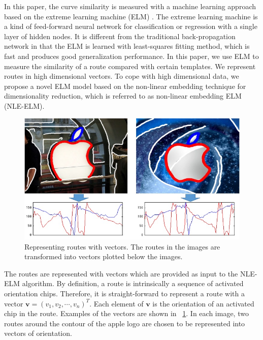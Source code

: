 \documentclass[journal]{IEEEtran}
\begin{document}
In this paper, the curve similarity is measured with a machine learning approach based on 
the extreme learning machine (ELM) \cite{huang2006}.
The extreme learning machine is a kind of feed-forward neural network for classification or regression
with a single layer of hidden nodes.
It is different from the traditional back-propagation network in that 
the ELM is learned with least-squares fitting method, which is fast and produces good generalization performance.
In this paper, we use ELM to measure the similarity of a route compared with certain templates.
We represent routes in high dimensional vectors.
To cope with high dimensional data, we propose a novel ELM model based on the non-linear embedding technique
for dimensionality reduction, which is referred to as non-linear embedding ELM (NLE-ELM).

\begin{figure}[!t]
\centering
\includegraphics[width=0.9\linewidth]{images/fig12.jpg}
\caption{Representing routes with vectors.
The routes in the images are transformed into vectors plotted below the images.}
\label{fig:12}
\end{figure}

The routes are represented with vectors which are provided as input to the NLE-ELM algorithm.
By definition, a route is intrinsically a sequence of activated orientation chips.
Therefore, it is straight-forward to represent a route with a vector $\boldsymbol{v}=(v_1,v_2,\cdots,v_n)^T$.
Each element of $\boldsymbol{v}$ is the orientation of an activated chip in the route.
Examples of the vectors are shown in \figurename~\ref{fig:12}.
In each image, two routes around the contour of the apple logo are chosen to be represented into vectors of orientation.
\end{document}
